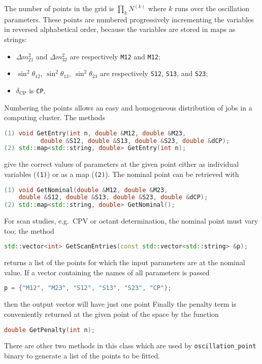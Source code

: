 \documentclass[a4paper, 11pt]{article}
\begin{document}
The number of points in the grid is $\prod_k N^{(k)}$ where $k$ runs over the oscillation parameters.
These points are numbered progressively incrementing the variables in reversed alphabetical order, because %
the variables are stored in maps as strings:
\begin{itemize}
	\item $\Delta m^2_{21}$ and $\Delta m^2_{32}$ are respectively \texttt{M12} and \texttt{M12};
	\item $\sin^2\theta_{12}$, $\sin^2 \theta_{13}$, $\sin^2 \theta_{23}$ are respectively \texttt{S12}, \texttt{S13}, %
		and \texttt{S23};
	\item $\delta_\text{CP}$ is \texttt{CP}.
\end{itemize}
Numbering the points allows an easy and homogeneous distribution of jobs in a computing cluster.
The methods
\begin{lstlisting}[language=C++]
(1) void GetEntry(int n, double &M12, double &M23,
		  double &S12, double &S13, double &S23, double &dCP);
(2) std::map<std::string, double> GetEntry(int n);
\end{lstlisting}
give the correct values of parameters at the given point either as individual variables (\texttt{(1)}) or as a map (\texttt{(2)}).
The nominal point can be retrieved with
\begin{lstlisting}[language=C++]
(1) void GetNominal(double &M12, double &M23,
	double &S12, double &S13, double &S23, double &dCP);
(2) std::map<std::string, double> GetNominal();
\end{lstlisting}
For scan studies, e.g.\ CPV or octant determination, the nominal point must vary too; %
the method 
\begin{lstlisting}[language=C++]
    std::vector<int> GetScanEntries(const std::vector<std::string> &p);
\end{lstlisting}
returns a list of the points for which the input parameters are at the nominal value.
If a vector containing the names of all parameters is passed
\begin{lstlisting}[language=C++]
    p = {"M12", "M23", "S12", "S13", "S23", "CP"};
\end{lstlisting}
then the output vector will have just one point
Finally the penalty term is conveniently returned at the given point of the space by the function
\begin{lstlisting}[language=C++]
    double GetPenalty(int n);
\end{lstlisting}

There are other two methods in this class which are used by \texttt{oscillation\_point} binary %
to generate a list of the points to be fitted.
\end{document}
